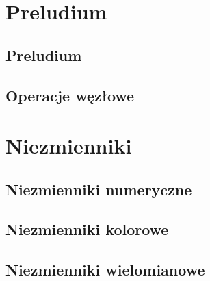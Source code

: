 \documentclass{LegrandOrangeBook}
\begin{document}






\tableofcontents

\pagestyle{fancy} %
\cleardoublepage %

\chapterspaceabove{5.75cm} %
\chapterspacebelow{7.25cm} %

\part{Preludium}
\chapter{Preludium}




\chapter{Operacje węzłowe}



\part{Niezmienniki}
\chapter{Niezmienniki numeryczne}


\chapter{Niezmienniki kolorowe}





\chapter{Niezmienniki wielomianowe}







\end{document}
